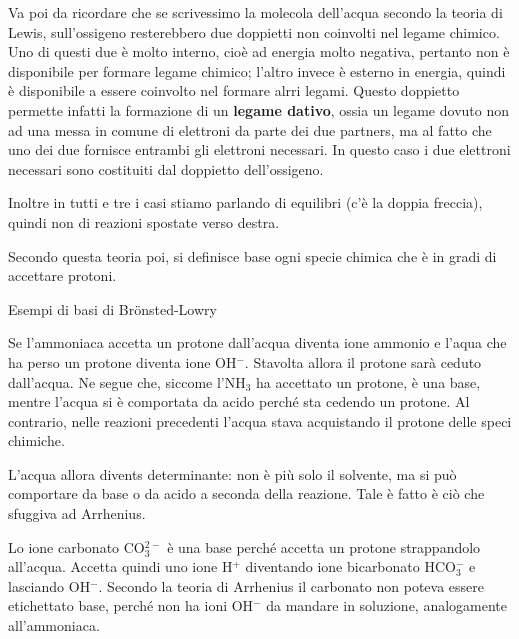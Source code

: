 Va poi da ricordare che se scrivessimo la molecola dell'acqua secondo la teoria di Lewis, sull'ossigeno resterebbero due doppietti non coinvolti nel legame chimico. Uno di questi due è molto interno, cioè ad energia molto negativa, pertanto non è disponibile per formare legame chimico; l'altro invece è esterno in energia, quindi è disponibile a essere coinvolto nel formare alrri legami. Questo doppietto permette infatti la formazione di un \textbf{legame dativo}, ossia un legame dovuto non ad una messa in comune di elettroni da parte dei due partners, ma al fatto che uno dei due fornisce entrambi gli elettroni necessari. In questo caso i due elettroni necessari sono costituiti dal doppietto dell'ossigeno.

Inoltre in tutti e tre i casi stiamo parlando di equilibri (c'è la doppia freccia), quindi non di reazioni spostate verso destra.

\vspace{0.2cm}Secondo questa teoria poi, si definisce base ogni specie chimica che è in gradi di accettare protoni.

\vspace{0.2cm}Esempi di basi di Brönsted-Lowry

\vspace{0.2cm}

\vspace{0.2cm}Se l'ammoniaca accetta un protone dall'acqua diventa ione ammonio e l'aqua che ha perso un protone diventa ione OH$^-$. Stavolta allora il protone sarà ceduto dall'acqua. Ne segue che, siccome l'NH$_3$ ha accettato un protone, è una base, mentre l'acqua si è comportata da acido perché sta cedendo un protone. Al contrario, nelle reazioni precedenti l'acqua stava acquistando il protone delle speci chimiche.

L'acqua allora divents determinante: non è più solo il solvente, ma si può comportare da base o da acido a seconda della reazione. Tale è fatto è ciò che sfuggiva ad Arrhenius.

\vspace{0.2cm}

\vspace{0.2cm}Lo ione carbonato CO$_3^{2-}$ è una base perché accetta un protone strappandolo all'acqua. Accetta quindi uno ione H$^+$ diventando ione bicarbonato HCO$_3^-$ e lasciando OH$^-$. Secondo la teoria di Arrhenius il carbonato non poteva essere etichettato base, perché non ha ioni OH$^-$ da mandare in soluzione, analogamente all'ammoniaca.

